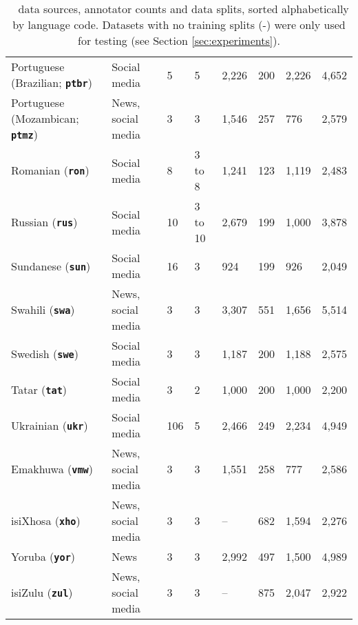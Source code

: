 \begin{table*}[ht]
{\begin{tabular}{p{4.1cm}p{2.4cm}p{1.5cm}p{1cm}p{0.8cm}p{0.8cm}p{0.8cm}p{0.8cm}}
        Portuguese (Brazilian; \textbf{\texttt{ptbr}}) & Social media  & 5 & 5 & 2,226 & 200 & 2,226& 4,652 \\
        Portuguese (Mozambican; \textbf{\texttt{ptmz}})  & News, social media & 3 & 3 & 1,546 & 257 & 776 & 2,579\\
        Romanian (\textbf{\texttt{ron}})   & Social media & 8 & 3 to 8 & 1,241
 & 123 & 1,119 & 2,483\\
        Russian (\textbf{\texttt{rus}})   & Social media & 10 & 3 to 10 & 2,679 & 199 & 1,000 & 3,878\\
        Sundanese (\textbf{\texttt{sun}})   & Social media & 16 & 3 & 924 & 199 & 926 & 2,049\\
        Swahili (\textbf{\texttt{swa}})   & News, social media & 3 & 3 & 3,307 & 551 & 1,656 & 5,514\\
        Swedish (\textbf{\texttt{swe}})   & Social media & 3 & 3 & 1,187 & 200 & 1,188 & 2,575\\
        Tatar (\textbf{\texttt{tat}})   & Social media & 3 & 2 & 1,000 & 200 & 1,000 & 2,200\\
        Ukrainian (\textbf{\texttt{ukr}})   & Social media & 106 & 5 & 2,466 & 249 & 2,234 & 4,949\\
        Emakhuwa (\textbf{\texttt{vmw}})   & News, social media & 3 & 3 & 1,551 & 258 & 777 & 2,586\\
        isiXhosa (\textbf{\texttt{xho}})   & News, social media & 3 & 3 & -- & 682 & 1,594 & 2,276\\
        Yoruba (\textbf{\texttt{yor}})   & News & 3 & 3 & 2,992 & 497 & 1,500 & 4,989\\
        isiZulu (\textbf{\texttt{zul}})   & News, social media & 3 & 3 & -- & 875 & 2,047 & 2,922\\
    \bottomrule
    \end{tabular}
    }
    \caption{\datasetname~ data sources, annotator counts and data splits, sorted alphabetically by language code. Datasets with no training splits (-) were only used for testing (see Section \ref{sec:experiments}).}
    \label{tab:data_sources}
\end{table*}